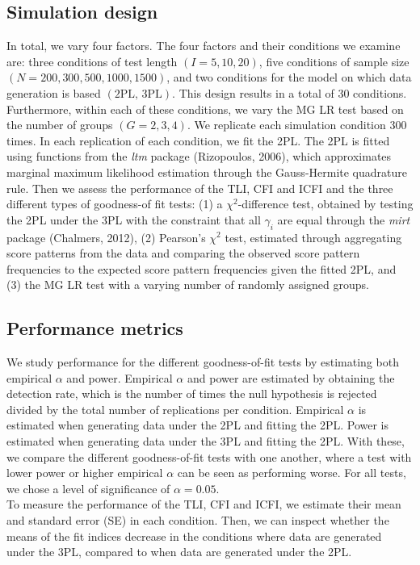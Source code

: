\documentclass[Royal,sageapa,times,doublespace]{sagej}
\begin{document}
\subsection{Simulation design}
In total, we vary four factors. The four factors and their conditions we examine are: three conditions of test length $(I = 5, 10, 20)$, five conditions of sample size $(N = 200, 300, 500, 1000, 1500)$, and two conditions for the model on which data generation is based $(\text{2PL, 3PL})$. This design results in a total of 30 conditions. Furthermore, within each of these conditions, we vary the MG LR test based on the number of groups $(G = 2, 3, 4)$. We replicate each simulation condition 300 times. In each replication of each condition, we fit the 2PL. The 2PL is fitted using functions from the \textit{ltm} package (Rizopoulos, 2006), which approximates marginal maximum likelihood estimation through the Gauss-Hermite quadrature rule. Then we assess the performance of the TLI, CFI and ICFI and the three different types of goodness-of fit tests: (1) a $\chi^2$-difference test, obtained by testing the 2PL under the 3PL with the constraint that all $\gamma_i$ are equal through the \textit{mirt} package (Chalmers, 2012), (2) Pearson's $\chi^2$ test, estimated through aggregating score patterns from the data and comparing the observed score pattern frequencies to the expected score pattern frequencies given the fitted 2PL, and (3) the MG LR test with a varying number of randomly assigned groups. 
\subsection{Performance metrics}
We study performance for the different goodness-of-fit tests by estimating both empirical $\alpha$ and power. Empirical $\alpha$ and power are estimated by obtaining the detection rate, which is the number of times the null hypothesis is rejected divided by the total number of replications per condition. Empirical $\alpha$ is estimated when generating data under the 2PL and fitting the 2PL. Power is estimated when generating data under the 3PL and fitting the 2PL. With these, we compare the different goodness-of-fit tests with one another, where a test with lower power or higher empirical $\alpha$ can be seen as performing worse. For all tests, we chose a level of significance of $\alpha = 0.05$.\\
\indent To measure the performance of the TLI, CFI and ICFI, we estimate their mean and standard error (SE) in each condition. Then, we can inspect whether the means of the fit indices decrease in the conditions where data are generated under the 3PL, compared to when data are generated under the 2PL. 
\end{document}
